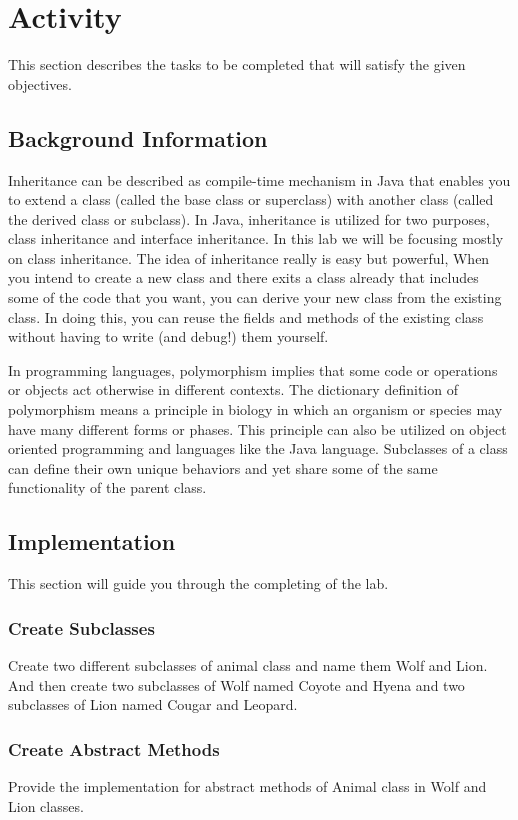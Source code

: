 \section{Activity}
This section describes the tasks to be completed that will satisfy the given objectives.
\subsection{Background Information}
Inheritance can be described as compile-time mechanism in Java that enables you to extend a class (called the base class or superclass) with another class (called the derived class or subclass). In Java, inheritance is utilized for two purposes, class inheritance and interface inheritance. In this lab we will be focusing mostly on class inheritance. The idea of inheritance really is easy but powerful, When you intend to create a new class and there exits a class already that includes some of the code that you want, you can derive your new class from the existing class. In doing this, you can reuse the fields and methods of the existing class without having to write (and debug!) them yourself. 

In programming languages, polymorphism implies that some code or operations or objects act otherwise in different contexts. The dictionary definition of polymorphism means a principle in biology in which an organism or species may have many different forms or phases. This principle can also be utilized on object oriented programming and languages like the Java language. Subclasses of a class can define their own unique behaviors and yet share some of the same functionality of the parent class.

\subsection{Implementation}	
This section will guide you through the completing of the lab.
\subsubsection{Create Subclasses}
Create two different subclasses of animal class and name them Wolf and Lion. And then create two subclasses of Wolf named Coyote and Hyena and two subclasses of Lion named Cougar and Leopard.

\subsubsection{Create Abstract Methods}
Provide the implementation for abstract methods of Animal class in Wolf and Lion classes.
	
